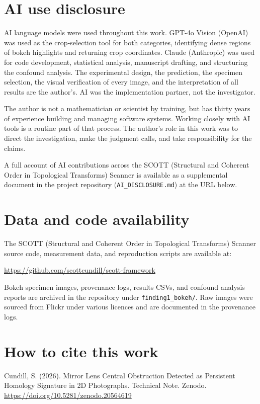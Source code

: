 \documentclass[11pt,a4paper]{article}
\begin{document}
\section{AI use disclosure}

AI language models were used throughout this work. GPT-4o Vision (OpenAI) was used as the crop-selection tool for both categories, identifying dense regions of bokeh highlights and returning crop coordinates. Claude (Anthropic) was used for code development, statistical analysis, manuscript drafting, and structuring the confound analysis. The experimental design, the prediction, the specimen selection, the visual verification of every image, and the interpretation of all results are the author's. AI was the implementation partner, not the investigator.

The author is not a mathematician or scientist by training, but has thirty years of experience building and managing software systems. Working closely with AI tools is a routine part of that process. The author's role in this work was to direct the investigation, make the judgment calls, and take responsibility for the claims.

A full account of AI contributions across the SCOTT (Structural and Coherent Order in Topological Transforms) Scanner is available as a supplemental document in the project repository (\texttt{AI\_DISCLOSURE.md}) at the URL below.

\section{Data and code availability}

The SCOTT (Structural and Coherent Order in Topological Transforms) Scanner source code, measurement data, and reproduction scripts are available at:

\url{https://github.com/scottcundill/scott-framework}

\noindent Bokeh specimen images, provenance logs, results CSVs, and confound analysis reports are archived in the repository under \texttt{finding1\_bokeh/}. Raw images were sourced from Flickr under various licences and are documented in the provenance logs.

\section*{How to cite this work}

\noindent Cundill, S. (2026). Mirror Lens Central Obstruction Detected as Persistent Homology Signature in 2D Photographs. Technical Note. Zenodo. \url{https://doi.org/10.5281/zenodo.20564619}
\end{document}
